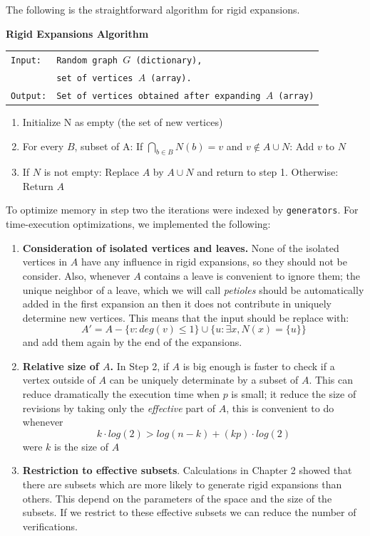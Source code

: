 The following is the straightforward algorithm for rigid expansions.

\begin{cajita}
\textbf{Rigid Expansions Algorithm} \hfill \break

\begin{tabular}{ l l }
\texttt{Input:} &  \texttt{Random graph $G$ (dictionary),} \\
                &  \texttt{set of vertices $A$ (array).}\\
\texttt{Output:} & \texttt{Set of vertices obtained after expanding $A$ (array)} \\
\end{tabular}
\begin{enumerate}
\item Initialize N as empty (the set of new vertices)
\item For every $B$, subset of A:\hfill \break
\hphantom{12} If $\bigcap\limits_{b\in B} N(b) = v$ and $v\not\in A\cup N$: \hfill \break
\hphantom{1234} Add $v$ to $N$
\item If $N$ is not empty: \hfill \break
\hphantom{12} Replace $A$ by $A\cup N$ and return to step 1. \hfill \break
      Otherwise:\hfill \break
\hphantom{12} Return $A$
\end{enumerate}
\end{cajita}

To optimize memory in step two the iterations were indexed by \texttt{generators}. For time-execution optimizations, we implemented the following:

\begin{enumerate}
\item \textbf{Consideration of isolated vertices and leaves.} None of the isolated vertices in $A$ have any influence in rigid expansions, so they should not be consider. Also, whenever $A$ contains a leave is convenient to ignore them; the unique neighbor of a leave, which we will call \textit{petioles} should be automatically added in the first expansion an then it does not contribute in uniquely determine new vertices. This means that the input should be replace with:
$$A' = A - \{v: deg(v)\leq 1 \} \cup \{u: \exists x, N(x)=\{u\}\} $$
and add them again by the end of the expansions.
\item \textbf{Relative size of $A$.} In Step 2, if $A$ is big enough is faster to check if a vertex outside of $A$ can be uniquely determinate by a subset of $A$. This can reduce dramatically the execution time when $p$ is small; it reduce the size of revisions by taking only the \textit{effective} part of $A$, this is convenient to do whenever
$$k\cdot log(2) > log(n-k) + (kp)\cdot log(2)$$
were $k$ is the size of $A$

\item \textbf{Restriction to effective subsets}. Calculations in Chapter 2 showed that there are subsets which are more likely to generate rigid expansions than others. This depend on the parameters of the space and the size of the subsets. If we restrict to these effective subsets we can reduce the number of verifications.
\end{enumerate}

